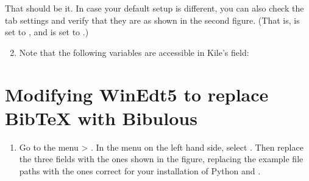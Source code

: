 \documentclass[letterpaper,10pt,english]{sphinxmanual}
\begin{document}
That should be it. In case your default setup is different, you can also check the  tab settings and verify that they are as shown in the second figure. (That is,  is set to , and  is set to .)
\begin{enumerate}
\setcounter{enumi}{1}
\item {} 
Note that the following variables are accessible in Kile’s  field:

%
\begin{sphinxVerbatim}[commandchars=\\\{\}]
         
       
      
      
\end{sphinxVerbatim}

\end{enumerate}


\section{Modifying WinEdt5 to replace BibTeX with Bibulous}
\label{\detokenize{getting_started:modifying-winedt5-to-replace-bibtex-with-bibulous}}\begin{enumerate}
\item {} 
Go to the menu  \textgreater{} . In the  menu on the left hand side, select . Then replace the three  fields with the ones shown in the figure, replacing the example file paths with the ones correct for your installation of Python and .

\end{enumerate}
\end{document}
